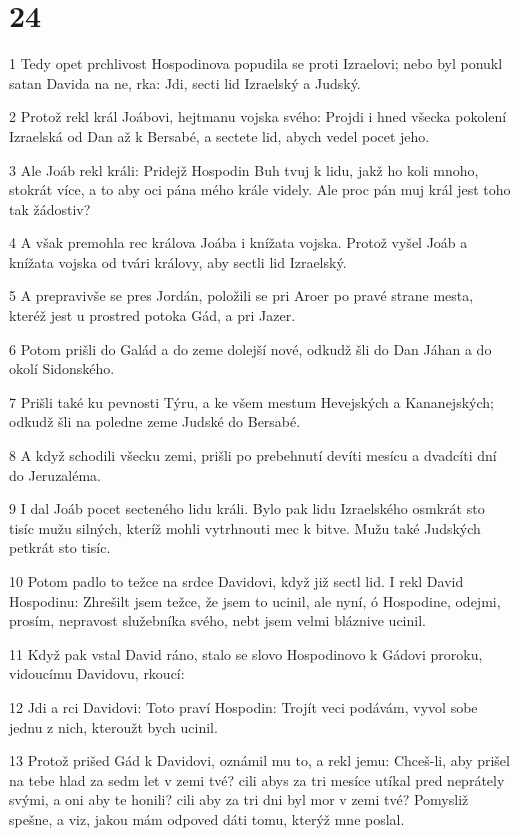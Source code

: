 \chapter{24}

\par 1 Tedy opet prchlivost Hospodinova popudila se proti Izraelovi; nebo byl ponukl satan Davida na ne, rka: Jdi, secti lid Izraelský a Judský.
\par 2 Protož rekl král Joábovi, hejtmanu vojska svého: Projdi i hned všecka pokolení Izraelská od Dan až k Bersabé, a sectete lid, abych vedel pocet jeho.
\par 3 Ale Joáb rekl králi: Pridejž Hospodin Buh tvuj k lidu, jakž ho koli mnoho, stokrát více, a to aby oci pána mého krále videly. Ale proc pán muj král jest toho tak žádostiv?
\par 4 A však premohla rec králova Joába i knížata vojska. Protož vyšel Joáb a knížata vojska od tvári královy, aby sectli lid Izraelský.
\par 5 A prepravivše se pres Jordán, položili se pri Aroer po pravé strane mesta, kteréž jest u prostred potoka Gád, a pri Jazer.
\par 6 Potom prišli do Galád a do zeme dolejší nové, odkudž šli do Dan Jáhan a do okolí Sidonského.
\par 7 Prišli také ku pevnosti Týru, a ke všem mestum Hevejských a Kananejských; odkudž šli na poledne zeme Judské do Bersabé.
\par 8 A když schodili všecku zemi, prišli po prebehnutí devíti mesícu a dvadcíti dní do Jeruzaléma.
\par 9 I dal Joáb pocet secteného lidu králi. Bylo pak lidu Izraelského osmkrát sto tisíc mužu silných, kteríž mohli vytrhnouti mec k bitve. Mužu také Judských petkrát sto tisíc.
\par 10 Potom padlo to težce na srdce Davidovi, když již sectl lid. I rekl David Hospodinu: Zhrešilt jsem težce, že jsem to ucinil, ale nyní, ó Hospodine, odejmi, prosím, nepravost služebníka svého, nebt jsem velmi bláznive ucinil.
\par 11 Když pak vstal David ráno, stalo se slovo Hospodinovo k Gádovi proroku, vidoucímu Davidovu, rkoucí:
\par 12 Jdi a rci Davidovi: Toto praví Hospodin: Trojít veci podávám, vyvol sobe jednu z nich, kteroužt bych ucinil.
\par 13 Protož prišed Gád k Davidovi, oznámil mu to, a rekl jemu: Chceš-li, aby prišel na tebe hlad za sedm let v zemi tvé? cili abys za tri mesíce utíkal pred neprátely svými, a oni aby te honili? cili aby za tri dni byl mor v zemi tvé? Pomysliž spešne, a viz, jakou mám odpoved dáti tomu, kterýž mne poslal.
